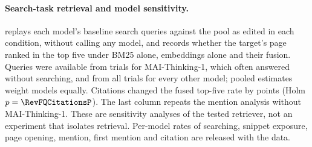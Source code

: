 \paragraph{Search-task retrieval and model sensitivity.}  replays each model's baseline
search queries against the pool as edited in each condition, without calling any model, and records whether the
target's page ranked in the top five under BM25 alone, embeddings alone and their fusion. Queries were available from
\RevMAIQueryTrials{} trials for MAI-Thinking-1, which often answered without searching, and from all
\RevOtherQueryTrials{} trials for every other model; pooled estimates weight models equally. Citations changed the
fused top-five rate by \RevFQCitations{} points (Holm $p=\RevFQCitationsP$). The last column repeats the mention
analysis without MAI-Thinking-1. These are sensitivity analyses of the tested retriever, not an experiment that
isolates retrieval. Per-model rates of searching, snippet exposure, page opening, mention, first mention and citation
are released with the data.

\begin{table}[htbp]
\centering\small
\caption{Search task: effects on the share of replayed baseline queries that returned the target's page in the top
five, by ranking method, and effects on mentions without MAI-Thinking-1 (percentage points; 95\% scenario-clustered
intervals; $^{*}$Holm-adjusted $p<0.05$ within each column).}
\label{tab:retrievalreplay}

\end{table}
